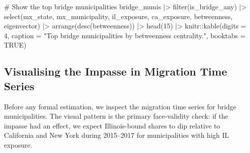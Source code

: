 \documentclass[
  11pt,
  letterpaper,
  DIV=11,
  numbers=noendperiod]{scrartcl}
\newenvironment{Shaded}{}{}
\newcommand{\AttributeTok}[1]{\textcolor[rgb]{0.84,0.23,0.29}{#1}}
\newcommand{\CommentTok}[1]{\textcolor[rgb]{0.42,0.45,0.49}{#1}}
\newcommand{\ConstantTok}[1]{\textcolor[rgb]{0.00,0.36,0.77}{#1}}
\newcommand{\DecValTok}[1]{\textcolor[rgb]{0.00,0.36,0.77}{#1}}
\newcommand{\FunctionTok}[1]{\textcolor[rgb]{0.44,0.26,0.76}{#1}}
\newcommand{\NormalTok}[1]{\textcolor[rgb]{0.14,0.16,0.18}{#1}}
\newcommand{\SpecialCharTok}[1]{\textcolor[rgb]{0.00,0.36,0.77}{#1}}
\newcommand{\StringTok}[1]{\textcolor[rgb]{0.01,0.18,0.38}{#1}}
\begin{document}
\begin{Shaded}
\begin{Highlighting}[]
\CommentTok{\# Show the top bridge municipalities}
\NormalTok{bridge\_munis }\SpecialCharTok{|\textgreater{}}
  \FunctionTok{filter}\NormalTok{(is\_bridge\_any) }\SpecialCharTok{|\textgreater{}}
  \FunctionTok{select}\NormalTok{(mx\_state, mx\_municipality, il\_exposure, ca\_exposure, betweenness, eigenvector) }\SpecialCharTok{|\textgreater{}}
  \FunctionTok{arrange}\NormalTok{(}\FunctionTok{desc}\NormalTok{(betweenness)) }\SpecialCharTok{|\textgreater{}}
  \FunctionTok{head}\NormalTok{(}\DecValTok{15}\NormalTok{) }\SpecialCharTok{|\textgreater{}}
\NormalTok{  knitr}\SpecialCharTok{::}\FunctionTok{kable}\NormalTok{(}\AttributeTok{digits =} \DecValTok{4}\NormalTok{,}
               \AttributeTok{caption =} \StringTok{"Top bridge municipalities by betweenness centrality."}\NormalTok{,}
               \AttributeTok{booktabs =} \ConstantTok{TRUE}\NormalTok{)}
\end{Highlighting}
\end{Shaded}

\subsection{Visualising the Impasse in Migration Time
Series}\label{visualising-the-impasse-in-migration-time-series}

Before any formal estimation, we inspect the migration time series for
bridge municipalities. The visual pattern is the primary face-validity
check: if the impasse had an effect, we expect Illinois-bound shares to
dip relative to California and New York during 2015--2017 for
municipalities with high IL exposure.
\end{document}

